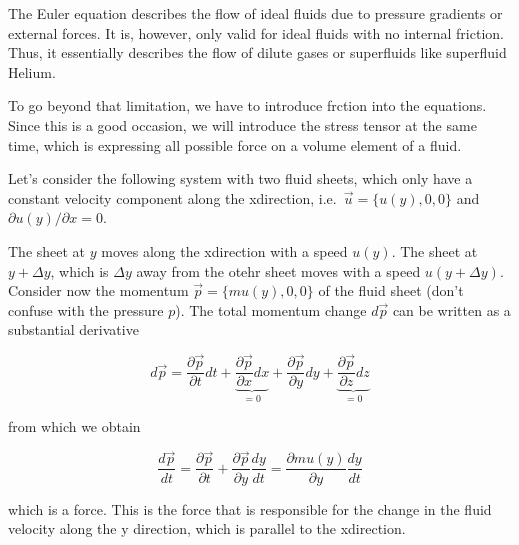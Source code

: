 \documentclass[letterpaper,10pt,english]{sphinxmanual}
\let\sphinxpxdimen\pdfpxdimen\else\newdimen\sphinxpxdimen
\begin{document}
\sphinxAtStartPar
The Euler equation describes the flow of ideal fluids due to pressure gradients or external forces. It is, however, only valid for ideal fluids with no internal friction. Thus, it essentially describes the flow of dilute gases or superfluids like superfluid Helium.

\sphinxAtStartPar
To go beyond that limitation, we have to introduce frction into the equations. Since this is a good occasion, we will introduce the stress tensor at the same time, which is expressing all possible force on a volume element of a fluid.

\sphinxAtStartPar
{}

\sphinxAtStartPar
Let’s consider the following system with two fluid sheets, which only have a constant velocity component along the x\sphinxhyphen{}direction, i.e. \(\vec{u}=\{u(y),0,0\}\) and \(\partial u(y)/\partial x=0\).

\noindent\sphinxincludegraphics[width=1536\sphinxpxdimen,height=630\sphinxpxdimen]{{viscosity}.png}

\sphinxAtStartPar
The sheet at \(y\) moves along the x\sphinxhyphen{}direction with a speed \(u(y)\). The sheet at \(y+\Delta y\), which is \(\Delta y\) away from the otehr sheet moves with a speed \(u(y+\Delta y)\). Consider now the momentum \(\vec{p}=\{m u(y),0,0 \}\) of the fluid sheet (don’t confuse with the pressure \(p\)). The total momentum change \(d\vec{p}\) can be written as a substantial derivative

\sphinxAtStartPar
\begin{equation}
d\vec{p}=\frac{\partial \vec{p}}{\partial t}dt +\underbrace{\frac{\partial \vec{p}}{\partial x}dx}_{=0} + \frac{\partial \vec{p}}{\partial y}dy+\underbrace{\frac{\partial \vec{p}}{\partial z}dz}_{=0}
\end{equation}

\sphinxAtStartPar
from which we obtain

\sphinxAtStartPar
\begin{equation}
\frac{d\vec{p}}{dt}=\frac{\partial \vec{p}}{\partial t}+\frac{\partial \vec{p}}{\partial y}\frac{dy}{dt}=\frac{\partial m u(y)}{\partial y}\frac{dy}{dt}
\end{equation}

\sphinxAtStartPar
which is a force. This is the force that is responsible for the change in the fluid velocity along the y direction, which is parallel to the x\sphinxhyphen{}direction.

\noindent\sphinxincludegraphics[width=673\sphinxpxdimen,height=422\sphinxpxdimen]{{stress}.png}
\end{document}

